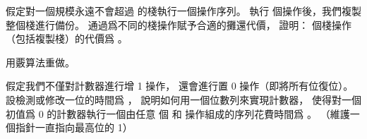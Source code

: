 \startsection[
  title={The accounting method},
]

\startEXERCISE
假定對一個規模永遠不會超過  的棧執行一個操作序列。
執行  個操作後，我們複製整個棧進行備份。
通過爲不同的棧操作賦予合適的攤還代價，
證明：  個棧操作（包括複製棧）的代價爲 。
\stopEXERCISE

\startANSWER

\stopANSWER

\startEXERCISE
用覈算法重做。
\stopEXERCISE

\startANSWER

\stopANSWER

\startEXERCISE
假定我們不僅對計數器進行增 1 操作，
還會進行置 0 操作（即將所有位復位）。
設檢測或修改一位的時間爲 ，
說明如何用一個位數列來實現計數器，
使得對一個初值爲 0 的計數器執行一個由任意  個  和  操作組成的序列花費時間爲 。
（\hint 維護一個指針一直指向最高位的 1）
\stopEXERCISE

\startANSWER

\stopANSWER

\stopsection
